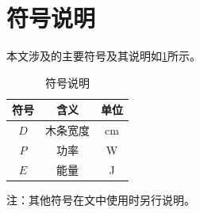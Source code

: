 
\section{符号说明}

本文涉及的主要符号及其说明如\cref{tab:symbols}所示。

\begin{table}[!htbp]
	\caption{符号说明}\label{tab:symbols} \centering
	\begin{tabular}{ccc}
		\toprule[1.5pt]
		符号 & 含义 & 单位 \\
		\midrule[1pt]
		$D$ & 木条宽度 & cm \\
		$P$ & 功率 & W \\
		$E$ & 能量 & J \\
		\bottomrule[1.5pt]
	\end{tabular}
\end{table}

注：其他符号在文中使用时另行说明。
